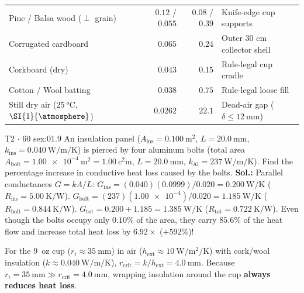 \begin{quicksheet}
\begin{twocol}[0.50]
{\begin{tabularx}{\linewidth}{@{}l r r X@{}}
Pine / Balsa wood ($\perp$ grain) & $0.12$ / $0.055$ & $0.08$ / $0.39$ & Knife-edge cup supports\\
Corrugated cardboard & $0.065$ & $0.24$ & Outer 30 cm collector shell\\
Corkboard (dry) & $0.043$ & $0.15$ & Rule-legal cup cradle\\
Cotton / Wool batting & $0.038$ & $0.75$ & Rule-legal loose fill\\
Still dry air ($\SI{25}{\celsius}$, $\SI{1}{\atmosphere}$) & $0.0262$ & $22.1$ & Dead-air gap ($\delta \le \SI{12}{\milli\meter}$)\\\bottomrule
\end{tabularx}}
\nextcol[0.48]
\begin{workedexample}{T2 $\cdot$ 60 s}{ex:01.9}
An insulation panel ($A_{\mathrm{ins}} = \SI{0.100}{\square\meter}$, $L = \SI{20.0}{\milli\meter}$, $k_{\mathrm{ins}} = \SI{0.040}{\watt\per\meter\per\kelvin}$) is pierced by four aluminum bolts (total area $A_{\mathrm{bolt}} = \SI{1.00e-4}{\square\meter} = \SI{1.00}{\square\centi\meter}$, $L = \SI{20.0}{\milli\meter}$, $k_{\mathrm{Al}} = \SI{237}{\watt\per\meter\per\kelvin}$). Find the percentage increase in conductive heat loss caused by the bolts.
\textbf{Sol.:} Parallel conductances $G = kA/L$:
$G_{\mathrm{ins}} = (0.040)(0.0999)/0.020 = \SI{0.200}{\watt\per\kelvin}$ ($R_{\mathrm{ins}} = \SI{5.00}{\kelvin\per\watt}$).
$G_{\mathrm{bolt}} = (237)(\num{1.00e-4})/0.020 = \SI{1.185}{\watt\per\kelvin}$ ($R_{\mathrm{bolt}} = \SI{0.844}{\kelvin\per\watt}$).
$G_{\mathrm{tot}} = 0.200 + 1.185 = \SI{1.385}{\watt\per\kelvin}$ ($R_{\mathrm{tot}} = \SI{0.722}{\kelvin\per\watt}$).
Even though the bolts occupy only $0.10\%$ of the area, they carry $85.6\%$ of the heat flow and increase total heat loss by $\mathbf{6.92\times}$ ($+592\%$)!
\end{workedexample}
\begin{devicebox}
For the 9~oz cup ($r_i \approx \SI{35}{\milli\meter}$) in air ($h_{\mathrm{ext}} \approx \SI{10}{\watt\per\square\meter\per\kelvin}$) with cork/wool insulation ($k \approx \SI{0.040}{\watt\per\meter\per\kelvin}$), $r_{\mathrm{crit}} = k/h_{\mathrm{ext}} = \SI{4.0}{\milli\meter}$. Because $r_i = \SI{35}{\milli\meter} \gg r_{\mathrm{crit}} = \SI{4.0}{\milli\meter}$, wrapping insulation around the cup \textbf{always reduces heat loss}.
\end{devicebox}
\end{twocol}
\end{quicksheet}

